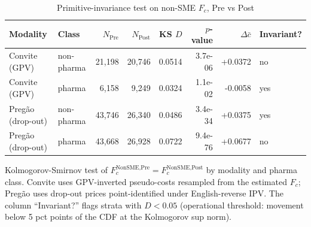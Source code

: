 \begin{table}[htbp]
\centering
\begin{threeparttable}
\caption{Primitive-invariance test on non-SME $F_c$, Pre vs Post}
\label{tab:v3_primitive_invariance}
\small
\setlength{\tabcolsep}{4pt}
\begin{tabular}{llrrrrrl}
\toprule
Modality & Class & $N_{\text{Pre}}$ & $N_{\text{Post}}$ & KS $D$ & $p$-value & $\Delta\bar{c}$ & Invariant? \\
\midrule
Convite (GPV) & non-pharma & 21,198 & 20,746 & 0.0514 & 3.7e-06 & +0.0372 & no \\
Convite (GPV) & pharma & 6,158 & 9,249 & 0.0324 & 1.1e-02 & -0.0058 & yes \\
Pregão (drop-out) & non-pharma & 43,746 & 26,340 & 0.0486 & 3.4e-34 & +0.0375 & yes \\
Pregão (drop-out) & pharma & 43,668 & 26,928 & 0.0722 & 9.4e-76 & +0.0677 & no \\
\bottomrule
\end{tabular}
\begin{tablenotes}\footnotesize
\item Kolmogorov-Smirnov test of $F_c^{\text{NonSME},\text{Pre}} =
F_c^{\text{NonSME},\text{Post}}$ by modality and pharma class.
Convite uses GPV-inverted pseudo-costs resampled from the estimated
$F_c$; Preg\~ao uses drop-out prices point-identified under
English-reverse IPV. The column ``Invariant?'' flags strata with
$D < 0.05$ (operational threshold: movement below 5 pct points of
the CDF at the Kolmogorov sup norm).
\end{tablenotes}
\end{threeparttable}
\end{table}
